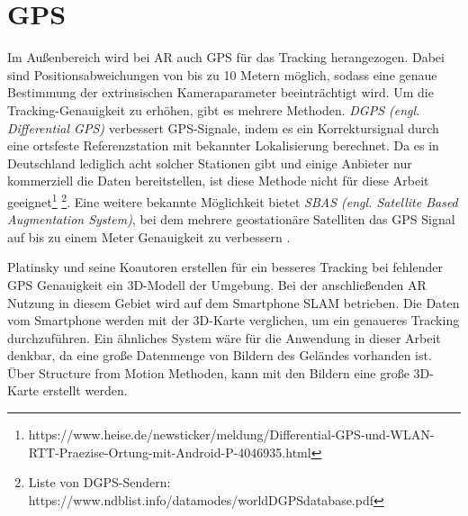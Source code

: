 \section{GPS}
\label{tracking-gps-tracking}
Im Außenbereich wird bei AR auch GPS für das Tracking herangezogen. Dabei sind Positionsabweichungen von bis zu 10 Metern möglich, sodass eine genaue Bestimmung der extrinsischen Kameraparameter beeinträchtigt wird. Um die Tracking-Genauigkeit zu erhöhen, gibt es mehrere Methoden. \textit{DGPS (engl. Differential GPS)} verbessert GPS-Signale, indem es ein Korrektursignal durch eine ortsfeste Referenzstation mit bekannter Lokalisierung berechnet. Da es in Deutschland lediglich acht solcher Stationen gibt und einige Anbieter nur kommerziell die Daten bereitstellen, ist diese Methode nicht für diese Arbeit geeignet\footnote{https://www.heise.de/newsticker/meldung/Differential-GPS-und-WLAN-RTT-Praezise-Ortung-mit-Android-P-4046935.html} \footnote{Liste von DGPS-Sendern: https://www.ndblist.info/datamodes/worldDGPSdatabase.pdf}. Eine weitere bekannte Möglichkeit bietet \textit{SBAS (engl. Satellite Based Augmentation System)}, bei dem mehrere geostationäre Satelliten das GPS Signal auf bis zu einem Meter Genauigkeit zu verbessern \cite*{doerner}.

Platinsky und seine Koautoren\cite{platinsky} erstellen für ein besseres Tracking bei fehlender GPS Genauigkeit ein 3D-Modell der Umgebung. Bei der anschließenden AR Nutzung in diesem Gebiet wird auf dem Smartphone SLAM betrieben. Die Daten vom Smartphone werden mit der 3D-Karte verglichen, um ein genaueres Tracking durchzuführen. Ein ähnliches System wäre für die Anwendung in dieser Arbeit denkbar, da eine große Datenmenge von Bildern des Geländes vorhanden ist. Über Structure from Motion Methoden, kann mit den Bildern eine große 3D-Karte erstellt werden.